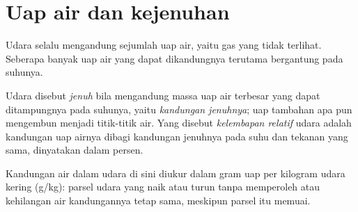 \section{Uap air dan kejenuhan}

Udara selalu mengandung sejumlah uap air, yaitu gas yang tidak terlihat.
Seberapa banyak uap air yang dapat dikandungnya terutama bergantung pada
suhunya.

\begin{definition}\label{def:g10:why-clouds-form:humidity}
Udara disebut \emph{jenuh} bila mengandung massa uap air
terbesar yang dapat ditampungnya pada suhunya, yaitu \emph{kandungan
jenuhnya}; uap tambahan apa pun mengembun menjadi titik-titik air. Yang
disebut \emph{kelembapan relatif} udara adalah
kandungan uap airnya dibagi kandungan jenuhnya pada suhu dan tekanan yang
sama, dinyatakan dalam persen.
\end{definition}

Kandungan air dalam udara di sini diukur dalam gram uap per kilogram udara
kering (\unit{g/kg}): parsel udara yang naik atau turun tanpa memperoleh atau
kehilangan air kandungannya tetap sama, meskipun parsel itu memuai.

